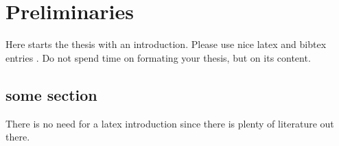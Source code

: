 \chapter{Preliminaries}
\label{chapter:Preliminaries}



Here starts the thesis with an introduction. Please use nice latex and bibtex entries \cite{latex}. Do not spend time on formating your thesis, but on its content. 
 
\section{some section}
There is no need for a latex introduction since there is plenty of literature out there.